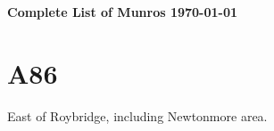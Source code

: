 \documentclass[12pt,a4paper]{article}
\begin{document}
\begin{center}
\Large\bf Complete List of  Munros
\large \today
\end{center}



 







\section{A86}

East of Roybridge, including Newtonmore area. 
\end{document}
